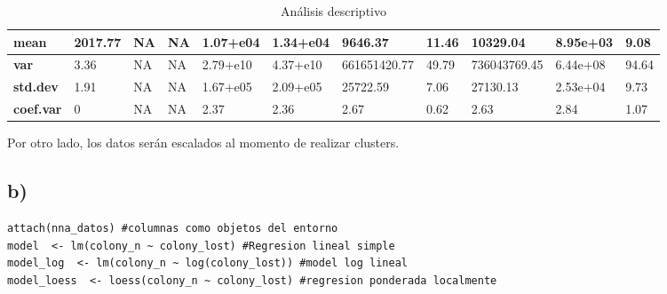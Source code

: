 \documentclass[b4paper]{article}
\begin{document}
\begin{table}[h]
\begin{tabular}{l|l|l|l|l|l|l|l|l|l|l|}
\multicolumn{1}{|l|}{\textbf{mean}}     & 2017.77       & NA              & NA             & 1.07+e04           & 1.34+e04             & 9646.37               & 11.46                      & 10329.04               & 8.95e+03              & 9.08                       \\ \hline
\multicolumn{1}{|l|}{\textbf{var}}      & 3.36          & NA              & NA             & 2.79+e10           & 4.37+e10             & 661651420.77          & 49.79                      & 736043769.45           & 6.44e+08              & 94.64                      \\ \hline
\multicolumn{1}{|l|}{\textbf{std.dev}}  & 1.91          & NA              & NA             & 1.67+e05           & 2.09+e05             & 25722.59              & 7.06                       & 27130.13               & 2.53e+04              & 9.73                       \\ \hline
\multicolumn{1}{|l|}{\textbf{coef.var}} & 0             & NA              & NA             & 2.37               & 2.36                 & 2.67                  & 0.62                       & 2.63                   & 2.84                  & 1.07                       \\ \hline
\end{tabular}
        \caption{An\'alisis descriptivo}
\end{table}
    \normalsize
    Por otro lado, los datos ser\'an escalados al momento de realizar clusters.
    \subsection{b)}
    \begin{tcolorbox}[title = input]
        \begin{verbatim}
attach(nna_datos) #columnas como objetos del entorno
model  <- lm(colony_n ~ colony_lost) #Regresion lineal simple
model_log  <- lm(colony_n ~ log(colony_lost)) #model log lineal
model_loess  <- loess(colony_n ~ colony_lost) #regresion ponderada localmente\end{verbatim}
    \end{tcolorbox}
\end{document}
